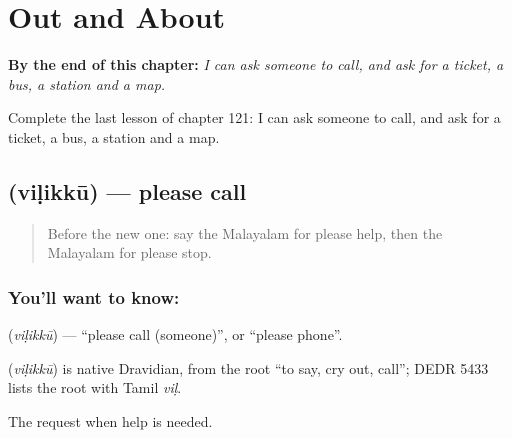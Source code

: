 
\chapter{Out and About}
\label{ch:ml-out-and-about}

\begin{chapteropening}
\textbf{By the end of this chapter:} \emph{I can ask someone to call, and ask for a ticket, a bus, a station and a map.}

Complete the last lesson of chapter 121: I can ask someone to call, and ask for a ticket, a bus, a station and a map.
\end{chapteropening}

\section[\texorpdfstring{\ml{വിളിക്കൂ} (viḷikkū)}{വിളിക്കൂ (viḷikkū)}]{ (viḷikkū) — please call}

\label{lesson:ML-C121-call}



\begin{quote}
Before the new one: say the Malayalam for please help, then the Malayalam for please stop.
\end{quote}

\subsection*{You'll want to know: }
\textbf{} (\emph{viḷikkū}) — \textquotedblleft{}please call (someone)\textquotedblright{}, or \textquotedblleft{}please phone\textquotedblright{}.

\begin{cousinweb}
\textbf{} (\emph{viḷikkū}) is native Dravidian, from the root \textquotedblleft{}to say, cry out, call\textquotedblright{}; DEDR 5433 lists the root with Tamil \emph{viḷ}.
\end{cousinweb}

\begin{grammarlens}[title={What you've built}]
The request when help is needed.
\end{grammarlens}

